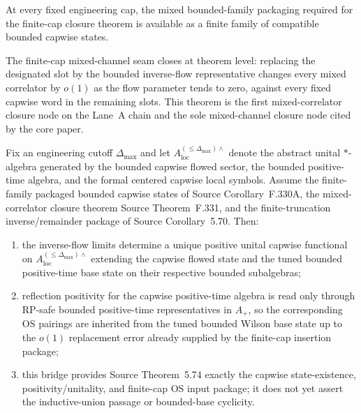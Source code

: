 \begin{corollary}
At every fixed engineering cap, the mixed bounded-family packaging required for the finite-cap closure theorem is available as a finite family of compatible bounded capwise states.
\end{corollary}

\begin{theorem}
The finite-cap mixed-channel seam closes at theorem level: replacing the designated slot by the bounded inverse-flow representative changes every mixed correlator by $o(1)$ as the flow parameter tends to zero, against every fixed capwise word in the remaining slots. This theorem is the first mixed-correlator closure node on the Lane~A chain and the sole mixed-channel closure node cited by the core paper.
\end{theorem}

\begin{thmLaneABridge}\label{thm:LaneA_closure_bridge}
Fix an engineering cutoff $\Delta_{\max}$ and let $A_{\mathrm{loc}}^{(\le \Delta_{\max})\wedge}$ denote the abstract unital $\ast$-algebra generated by the bounded capwise flowed sector, the bounded positive-time algebra, and the formal centered capwise local symbols. Assume the finite-family packaged bounded capwise states of Source Corollary~F.330A, the mixed-correlator closure theorem Source Theorem~F.331, and the finite-truncation inverse/remainder package of Source Corollary~5.70. Then:
\begin{enumerate}[label=(\roman*),leftmargin=2.2em]
\item the inverse-flow limits determine a unique positive unital capwise functional on $A_{\mathrm{loc}}^{(\le \Delta_{\max})\wedge}$ extending the capwise flowed state and the tuned bounded positive-time base state on their respective bounded subalgebras;
\item reflection positivity for the capwise positive-time algebra is read only through RP-safe bounded positive-time representatives in $A_+$, so the corresponding OS pairings are inherited from the tuned bounded Wilson base state up to the $o(1)$ replacement error already supplied by the finite-cap insertion package;
\item this bridge provides Source Theorem~5.74 exactly the capwise state-existence, positivity/unitality, and finite-cap OS input package; it does not yet assert the inductive-union passage or bounded-base cyclicity.
\end{enumerate}
\end{thmLaneABridge}

